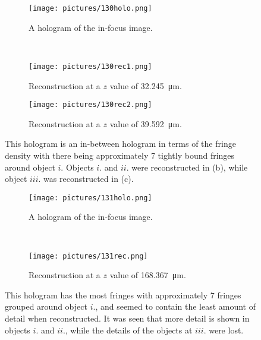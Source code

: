 \begin{figure}[ht!]
    \begin{center}

        \begin{subfigure}[t]{0.4\textwidth}
            \label{fig:130holo}
            \texttt{[image: pictures/130holo.png]}
            \caption{A hologram of the in-focus image.}
        \end{subfigure}
        \\
        \begin{subfigure}[t]{0.4\textwidth}
            \label{fig:130rec1}
            \texttt{[image: pictures/130rec1.png]}
            \caption{Reconstruction at a $z$ value of \SI{32.245}{\micro\meter}.}
        \end{subfigure}
                \hspace*{\fill}
%
        \begin{subfigure}[t]{0.4\textwidth}
            \label{fig:130rec2}
            \texttt{[image: pictures/130rec2.png]}
            \caption{Reconstruction at a $z$ value of \SI{39.592}{\micro\meter}.}
        \end{subfigure}


    \end{center}
    \caption{%
        This hologram is an in-between hologram in terms of the fringe density
        with there being approximately 7 tightly bound fringes around
        object $i.$
        Objects $i.$ and $ii.$ were reconstructed in (b),
        while object $iii.$ was reconstructed in (c).
    }%
    \label{fig:130}
\end{figure}


\begin{figure}[ht!]
    \begin{center}

        \begin{subfigure}[t]{0.4\textwidth}
            \label{fig:131holo}
            \texttt{[image: pictures/131holo.png]}
            \caption{A hologram of the in-focus image.}
        \end{subfigure}
        \\
        \begin{subfigure}[t]{0.9\textwidth}
            \label{fig:131rec}
            \texttt{[image: pictures/131rec.png]}
            \caption{Reconstruction at a $z$ value of \SI{168.367}{\micro\meter}.}
        \end{subfigure}

    \end{center}
    \caption{%
        This hologram has the most fringes with approximately 7 fringes
        grouped around object $i.$, and seemed to contain the least
        amount of detail when reconstructed. It was seen that more detail
        is shown in objects $i.$ and $ii.$, while the details of the objects at $iii.$
        were lost.
    }%
    \label{fig:131}
\end{figure}

